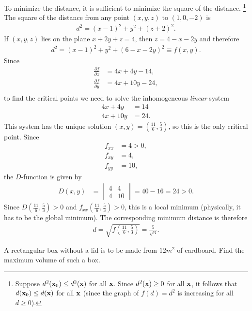 \documentclass[12pt,letterpaper,reqno]{article}
\numberwithin{equation}{section}
\newcommand{\bx}{{\bf x}}
\begin{document}
{{\color{red}
\begin{solution}
	To minimize the distance, it is sufficient to minimize the square of the distance. \footnote{Suppose $d^2(\bx_0) \leq d^2(\bx)$ for all $\bx$. Since $d^2(\bx) \geq 0$ for all $\bx$, it follows that $d(\bx_0) \leq d(\bx)$ for all $\bx$ (since the graph of $f(d)=d^2$ is increasing for all $d \geq 0$).} The square of the distance from any point $(x,y,z)$ to $(1,0,-2)$ is
	\begin{align*}
		d^2=(x-1)^2+y^2+(z+2)^2.
	\end{align*}
	If $(x,y,z)$ lies on the plane $x+2y+z=4$, then $z=4-x-2y$ and therefore
	\begin{align*}
		d^2=(x-1)^2+y^2+(6-x-2y)^2\equiv f(x,y).
	\end{align*}
	Since
	\begin{align*}
		\frac{\partial f}{\partial x}&=4x+4y-14, \\
		\frac{\partial f}{\partial y}&=4x+10y-24, \\
	\end{align*}
	to find the critical points we need to solve the inhomogeneous \emph{linear} system
	\begin{align*}
		4x+4y&=14 \\
		4x+10y&=24.
	\end{align*}
	This system has the unique solution $(x,y)=(\frac{11}{6},\frac{5}{3})$, so this is the only critical point. Since
	\begin{align*}
		f_{xx}&=4>0, \\
		f_{xy}&=4, \\
		f_{yy}&=10,
	\end{align*}
	the $D$-function is given by
	\begin{align*}
		D(x,y)&=\begin{vmatrix}
			4 & 4 \\
			4 & 10
		\end{vmatrix}=40-16=24>0.
	\end{align*}
	Since $D(\frac{11}{6},\frac{5}{3})>0$ and $f_{xx}(\frac{11}{6},\frac{5}{3})>0$, this is a local minimum (physically, it has to be the global minimum). The corresponding minimum distance is therefore
	\begin{align*}
		d=\sqrt{f(\frac{11}{6},\frac{5}{3})}=\frac{5}{\sqrt{6}}.
	\end{align*}
\end{solution}}

\begin{exercise}
A rectangular box without a lid is to be made from $12 m^2$ of cardboard. Find the maximum volume of such a box. 	
\end{exercise}

}
\end{document}
